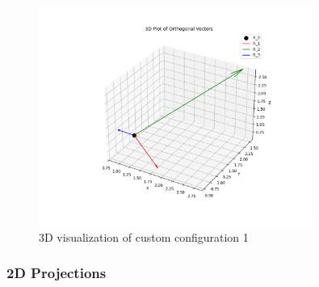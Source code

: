 \begin{figure}[H]
    \centering
    \includegraphics[width=0.8\textwidth]{figures/custom1_3d.png}
    \caption{3D visualization of custom configuration 1}
    \label{fig:example_custom1_3d}
\end{figure}

\subsubsection{2D Projections}


